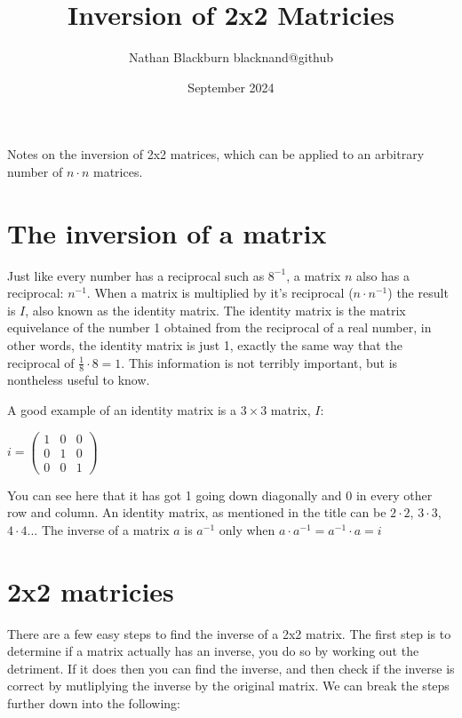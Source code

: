 \documentclass[options]{article}
\title{Inversion of 2x2 Matricies}
\author{Nathan Blackburn {blacknand@github}}
\date{September 2024}
\begin{document}
\maketitle
Notes on the inversion of 2x2 matrices, which can be applied to an arbitrary number of \( n \cdot n \) matrices.
\vspace{-1em}
\section{The inversion of a matrix}
Just like every number has a reciprocal such as \(8^{-1}\), a matrix \(n\) also has a reciprocal: \(n^{-1}\). When a matrix
is multiplied by it's reciprocal (\(n \cdot n^{-1}\)) the result is \(I\), also known as the identity matrix. The identity matrix
is the matrix equivelance of the number 1 obtained from the reciprocal of a real number, in other words, the identity matrix is just 1, exactly the same
way that the reciprocal of \(\frac{1}{8} \cdot 8 = 1\). This information is not terribly important, but is nontheless useful to know.
\par


A good example of an identity matrix is a \( 3 \times 3 \) matrix, \( I \):

\begin{center}

    \(
        i = 
        \begin{pmatrix}
        1 & 0 & 0\\
        0 & 1 & 0\\
        0 & 0 & 1
        \end{pmatrix}
    \)

\end{center}

You can see here that it has got 1 going down diagonally and 0 in every other row and column. An identity
matrix, as mentioned in the title can be \(2 \cdot 2\), \(3 \cdot 3\), \(4 \cdot 4\)... The inverse of a matrix \(a\) is \(a^{-1}\) only when \(a \cdot a^{-1} = a^{-1} \cdot a = i\)

\section{2x2 matricies}
There are a few easy steps to find the inverse of a 2x2 matrix. The first step is to determine if a matrix actually has an inverse, you do so by working out the detriment. 
If it does then you can find the inverse, and then check if the inverse is correct by mutliplying the inverse by the original matrix. We can break the steps further down into the following:
\end{document}
